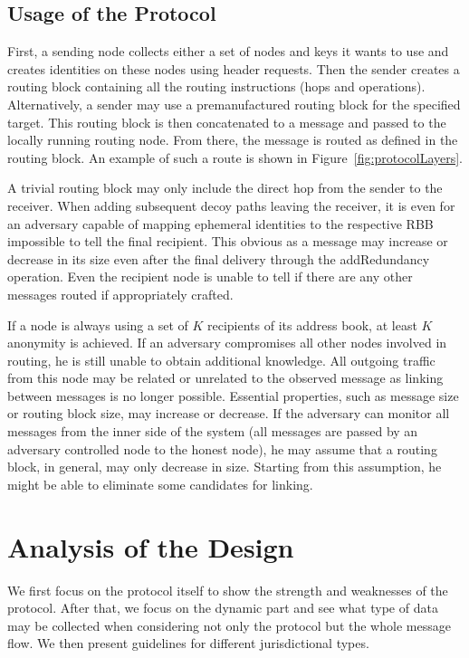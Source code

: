 \documentclass[acmsmall, screen, review]{acmart}
\begin{document}
\subsection{Usage of the Protocol}
First, a sending node collects either a set of nodes and keys it wants to use and creates identities on these nodes using header requests. Then the sender creates a routing block containing all the routing instructions (hops and operations). Alternatively, a sender may use a premanufactured routing block for the specified target. This routing block is then concatenated to a message and passed to the locally running routing node. From there, the message is routed as defined in the routing block. An example of such a route is shown in Figure~\ref{fig:protocolLayers}.

A trivial routing block may only include the direct hop from the sender to the receiver. When adding subsequent decoy paths leaving the receiver, it is even for an adversary capable of mapping ephemeral identities to the respective RBB impossible to tell the final recipient. This obvious as a message may increase or decrease in its size even after the final delivery through the addRedundancy operation. Even the recipient node is unable to tell if there are any other messages routed if appropriately crafted.

If a node is always using a set of $K$ recipients of its address book, at least $K$ anonymity is achieved. If an adversary compromises all other nodes involved in routing, he is still unable to obtain additional knowledge. All outgoing traffic from this node may be related or unrelated to the observed message as linking between messages is no longer possible. Essential properties, such as message size or routing block size, may increase or decrease. If the adversary can monitor all messages from the inner side of the system (all messages are passed by an adversary controlled node to the honest node), he may assume that a routing block, in general, may only decrease in size. Starting from this assumption, he might be able to eliminate some candidates for linking.

\section{Analysis of the Design\label{sec:discussion}}
We first focus on the protocol itself to show the strength and weaknesses of the protocol. After that, we focus on the dynamic part and see what type of data may be collected when considering not only the protocol but the whole message flow. We then present guidelines for different jurisdictional types.
\end{document}
